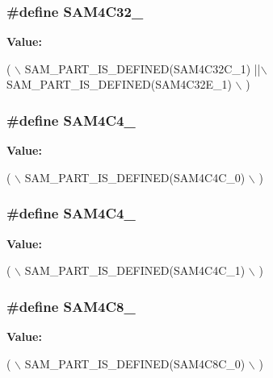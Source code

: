 \subsubsection[{S\+A\+M4\+C32\+\_\+1}]{\setlength{\rightskip}{0pt plus 5cm}\#define S\+A\+M4\+C32\+\_}\label{group__sam__part__macros__group_ga84c94a3f93f7d2a0c440607a263477b7}
{\bfseries Value\+:}
\begin{DoxyCode}
( \(\backslash\)
        SAM\_PART\_IS\_DEFINED(SAM4C32C\_1) ||\(\backslash\)
        SAM\_PART\_IS\_DEFINED(SAM4C32E\_1) \(\backslash\)
        )
\end{DoxyCode}
\hypertarget{group__sam__part__macros__group_ga77c44ef9d719d70486f81402ebee7b27}{}
\subsubsection[{S\+A\+M4\+C4\+\_\+0}]{\setlength{\rightskip}{0pt plus 5cm}\#define S\+A\+M4\+C4\+\_}\label{group__sam__part__macros__group_ga77c44ef9d719d70486f81402ebee7b27}
{\bfseries Value\+:}
\begin{DoxyCode}
( \(\backslash\)
        SAM\_PART\_IS\_DEFINED(SAM4C4C\_0) \(\backslash\)
        )
\end{DoxyCode}
\hypertarget{group__sam__part__macros__group_ga0ca9d376eb3cac4e27fb9bd79ec028a6}{}
\subsubsection[{S\+A\+M4\+C4\+\_\+1}]{\setlength{\rightskip}{0pt plus 5cm}\#define S\+A\+M4\+C4\+\_}\label{group__sam__part__macros__group_ga0ca9d376eb3cac4e27fb9bd79ec028a6}
{\bfseries Value\+:}
\begin{DoxyCode}
( \(\backslash\)
        SAM\_PART\_IS\_DEFINED(SAM4C4C\_1) \(\backslash\)
        )
\end{DoxyCode}
\hypertarget{group__sam__part__macros__group_ga6210432e77e4bc0e170dc71370a3e845}{}
\subsubsection[{S\+A\+M4\+C8\+\_\+0}]{\setlength{\rightskip}{0pt plus 5cm}\#define S\+A\+M4\+C8\+\_}\label{group__sam__part__macros__group_ga6210432e77e4bc0e170dc71370a3e845}
{\bfseries Value\+:}
\begin{DoxyCode}
( \(\backslash\)
        SAM\_PART\_IS\_DEFINED(SAM4C8C\_0) \(\backslash\)
        )
\end{DoxyCode}
\hypertarget{group__sam__part__macros__group_ga349700d2ac7573d426776e85f7632361}{}
